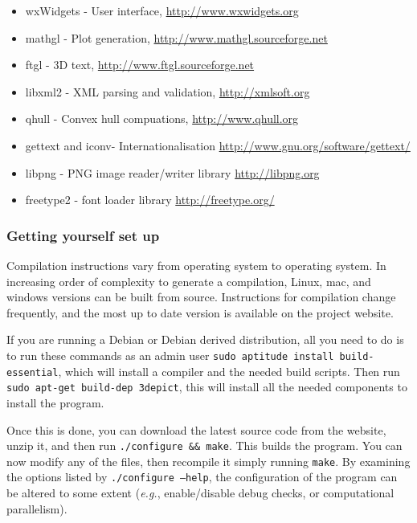 \documentclass[10pt]{article}
\begin{document}
\begin{itemize}
\item wxWidgets - User interface, \url{http://www.wxwidgets.org}
\item mathgl - Plot generation, \url{http://www.mathgl.sourceforge.net}
\item ftgl -  3D text, \url{http://www.ftgl.sourceforge.net}
\item libxml2 -  XML parsing and validation, \url{http://xmlsoft.org}
\item qhull -  Convex hull compuations, \url{http://www.qhull.org}
\item gettext and iconv- Internationalisation \url{http://www.gnu.org/software/gettext/}
\item libpng - PNG image reader/writer library \url{http://libpng.org}
\item freetype2 - font loader library \url{http://freetype.org/}
\end{itemize}


\subsubsection{Getting yourself set up}
Compilation instructions vary from operating system to operating system. In increasing order of complexity to generate a compilation, Linux, mac, and windows versions can be built from source. Instructions for compilation change frequently, and the most up to date version is available on the project website.

If you are running a Debian or Debian derived distribution, all you need to do is to run these commands as an admin user \texttt{sudo aptitude install build-essential}, which will install a compiler and the needed build scripts. Then run \texttt{sudo apt-get build-dep 3depict}, this will install all the needed components to install the program.

Once this is done, you can download the latest source code from the website, unzip it, and then run \texttt{./configure \&\& make}. This builds the program. You can now modify any of the files, then recompile it simply running \texttt{make}. By examining the options listed by \texttt{./configure --help}, the configuration of the program can be altered to some extent (\emph{e.g.}, enable/disable debug checks, or computational parallelism).
\end{document}
